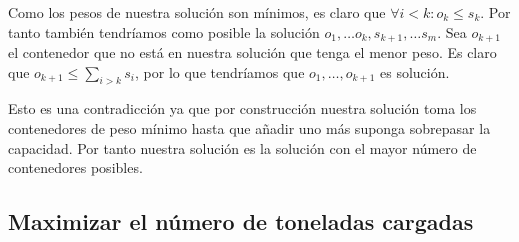 Como los pesos de nuestra solución son mínimos, es claro que $\forall i < k: o_k \leq s_k$.
Por tanto también tendríamos como posible la solución $o_1, \dots o_k, s_{k+1}, \dots s_m$.
Sea $o_{k+1}$ el contenedor que no está en nuestra solución que tenga el menor peso.
Es claro que $o_{k+1} \leq \sum_{i > k} s_i$, por lo que tendríamos que
$o_1, \dots, o_{k+1}$ es solución.

Esto es una contradicción ya que por construcción nuestra solución toma los contenedores
de peso mínimo hasta que añadir uno más suponga sobrepasar la capacidad. Por tanto nuestra
solución es la solución con el mayor número de contenedores posibles.

\subsection{Maximizar el número de toneladas cargadas}
